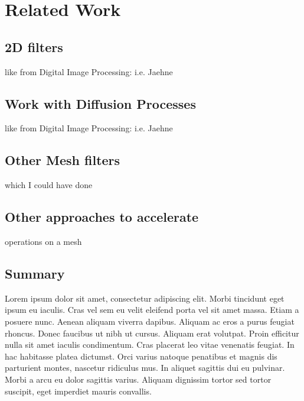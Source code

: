 \documentclass[openany]{book}
\begin{document}
\chapter{Related Work}
\section{2D filters}
	like from Digital Image Processing: i.e. Jaehne~\cite[p.~00]{SourceNeeded}



\section{Work with Diffusion Processes}
	like from Digital Image Processing: i.e. Jaehne~\cite[p.~00]{SourceNeeded}



\section{Other Mesh filters}
	which I could have done~\cite[p.~00]{SourceNeeded}



\section{Other approaches to accelerate}
	operations on a mesh~\cite[p.~00]{SourceNeeded}



\section{Summary}
Lorem ipsum dolor sit amet, consectetur adipiscing elit. Morbi tincidunt eget 
ipsum eu iaculis. Cras vel sem eu velit eleifend porta vel sit amet massa. Etiam 
a posuere nunc. Aenean aliquam viverra dapibus. Aliquam ac eros a purus feugiat 
rhoncus. Donec faucibus ut nibh ut cursus. Aliquam erat volutpat. Proin efficitur 
nulla sit amet iaculis condimentum. Cras placerat leo vitae venenatis feugiat. In 
hac habitasse platea dictumst. Orci varius natoque penatibus et magnis dis 
parturient montes, nascetur ridiculus mus. In aliquet sagittis dui eu pulvinar. 
Morbi a arcu eu dolor sagittis varius. Aliquam dignissim tortor sed tortor 
suscipit, eget imperdiet mauris convallis.
\end{document}
